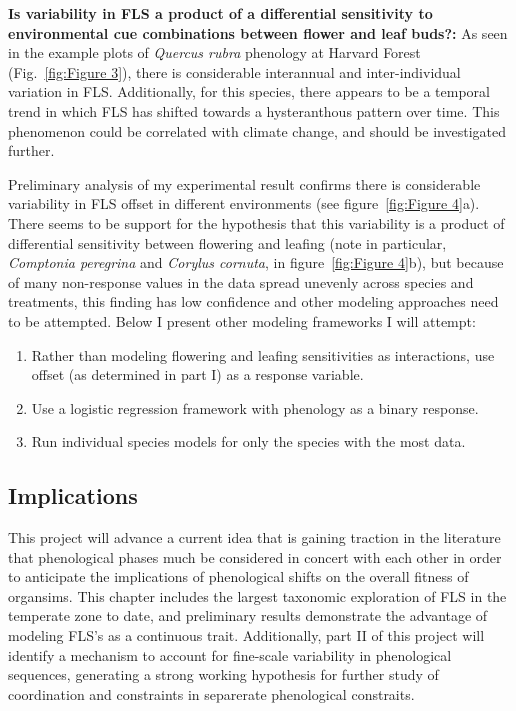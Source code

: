 \documentclass[12pt]{article}\usepackage[]{graphicx}\usepackage[]{color}
\begin{document}
\par\textbf{Is variability in FLS a product of a differential sensitivity to environmental cue combinations between flower and leaf buds?:} As seen in the  example plots of \textit{Quercus rubra} phenology at Harvard Forest (Fig.~\ref{fig:Figure 3}), there is considerable interannual and inter-individual variation in FLS. Additionally, for this species, there appears to be a temporal trend in which FLS has shifted towards a hysteranthous pattern over time. This phenomenon could be correlated with climate change, and should be investigated further.
\par Preliminary analysis of my experimental result confirms there is considerable variability in FLS offset in different environments (see figure~\ref{fig:Figure 4}a).  There seems to be support for the hypothesis that this variability is a product of differential sensitivity between flowering and leafing (note in particular, \textit{Comptonia peregrina} and \textit{Corylus cornuta}, in figure~\ref{fig:Figure 4}b), but because of many non-response values in the data spread unevenly across species and treatments, this finding has low confidence and other modeling approaches need to be attempted. Below I present other modeling frameworks I will attempt:
\begin{enumerate}
\item Rather than modeling flowering and leafing sensitivities as interactions, use offset (as determined in part I) as a response variable.
\item Use a logistic regression framework with phenology as a binary response.
\item Run individual species models for only the species with the most data.
\end{enumerate}
\subsection*{Implications}
\indent\indent This project will advance a current idea that is gaining traction in the literature that phenological phases much be considered in concert with each other in order to anticipate the implications of phenological shifts on the overall fitness of organsims. This chapter includes the largest taxonomic exploration of FLS in the temperate zone to date, and preliminary results demonstrate the advantage of modeling FLS's as a continuous trait. Additionally, part II of this project will identify a mechanism to account for fine-scale variability in phenological sequences, generating a strong working hypothesis for further study of coordination and constraints in separerate phenological constraits.
\end{document}
